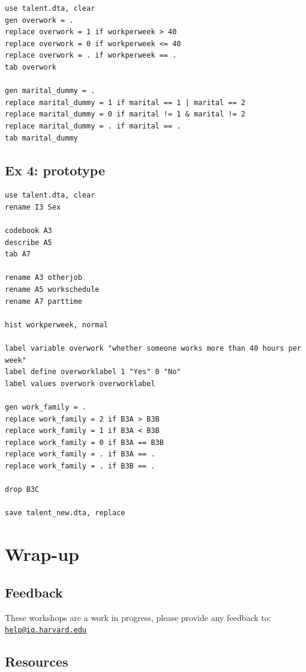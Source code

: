 \documentclass[]{book}
\begin{document}
\begin{verbatim}
use talent.dta, clear
gen overwork = .
replace overwork = 1 if workperweek > 40
replace overwork = 0 if workperweek <= 40
replace overwork = . if workperweek == .
tab overwork

gen marital_dummy = .
replace marital_dummy = 1 if marital == 1 | marital == 2
replace marital_dummy = 0 if marital != 1 & marital != 2
replace marital_dummy = . if marital == . 
tab marital_dummy
\end{verbatim}

\hypertarget{ex-4-prototype}{%
\subsection{Ex 4: prototype}\label{ex-4-prototype}}

\begin{verbatim}
use talent.dta, clear
rename I3 Sex

codebook A3
describe A5
tab A7

rename A3 otherjob
rename A5 workschedule
rename A7 parttime

hist workperweek, normal

label variable overwork "whether someone works more than 40 hours per week"
label define overworklabel 1 "Yes" 0 "No"
label values overwork overworklabel

gen work_family = .
replace work_family = 2 if B3A > B3B
replace work_family = 1 if B3A < B3B
replace work_family = 0 if B3A == B3B
replace work_family = . if B3A == . 
replace work_family = . if B3B == . 

drop B3C

save talent_new.dta, replace 
\end{verbatim}

\hypertarget{wrap-up-7}{%
\section{Wrap-up}\label{wrap-up-7}}

\hypertarget{feedback-7}{%
\subsection{Feedback}\label{feedback-7}}

These workshops are a work in progress, please provide any feedback to: \href{mailto:help@iq.harvard.edu}{\nolinkurl{help@iq.harvard.edu}}

\hypertarget{resources-9}{%
\subsection{Resources}\label{resources-9}}
\end{document}
